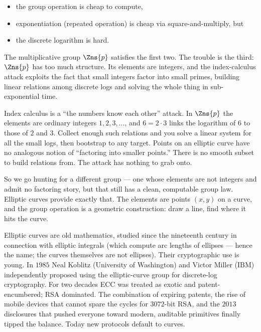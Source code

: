 \begin{itemize}
  \item the group operation is cheap to compute,
  \item exponentiation (repeated operation) is cheap via square-and-multiply, but
  \item the discrete logarithm is hard.
\end{itemize}

The multiplicative group $\Zns{p}$ satisfies the first two. The trouble is the third:
$\Zns{p}$ has too much structure. Its elements are integers, and the index-calculus
attack exploits the fact that small integers factor into small primes, building linear
relations among discrete logs and solving the whole thing in sub-exponential time.

\begin{intuitionbox}
Index calculus is a ``the numbers know each other'' attack. In $\Zns{p}$ the elements
are ordinary integers $1,2,3,\dots$, and $6 = 2\cdot 3$ links the logarithm of $6$ to
those of $2$ and $3$. Collect enough such relations and you solve a linear system for
all the small logs, then bootstrap to any target. Points on an elliptic curve have no
analogous notion of ``factoring into smaller points.'' There is no smooth subset to
build relations from. The attack has nothing to grab onto.
\end{intuitionbox}

So we go hunting for a different group --- one whose elements are not integers and
admit no factoring story, but that still has a clean, computable group law. Elliptic
curves provide exactly that. The elements are points $(x,y)$ on a curve, and the group
operation is a geometric construction: draw a line, find where it hits the curve.

\begin{historybox}
Elliptic curves are old mathematics, studied since the nineteenth century in connection
with elliptic integrals (which compute arc lengths of ellipses --- hence the name; the
curves themselves are not ellipses). Their cryptographic use is young. In $1985$ Neal
Koblitz (University of Washington) and Victor Miller (IBM) independently proposed using
the elliptic-curve group for discrete-log cryptography. For two decades ECC was treated
as exotic and patent-encumbered; RSA dominated. The combination of expiring patents,
the rise of mobile devices that cannot spare the cycles for $3072$-bit RSA, and the
$2013$ disclosures that pushed everyone toward modern, auditable primitives finally
tipped the balance. Today new protocols default to curves.
\end{historybox}

